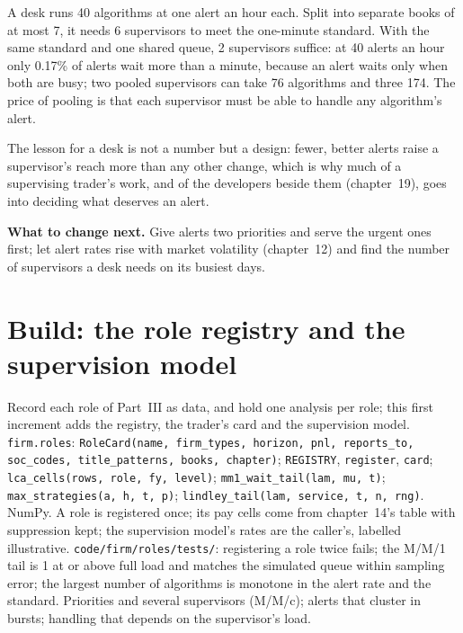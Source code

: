 \begin{example}[Pooling]\label{ex:in:trader:pool}
A desk runs 40 algorithms at one alert an hour each. Split into separate books of at most 7, it needs 6 supervisors to
meet the one-minute standard. With the same standard and one shared queue, 2 supervisors suffice: at 40 alerts an hour
only 0.17\% of alerts wait more than a minute, because an alert waits only when both are busy; two pooled supervisors
can take 76 algorithms and three 174. The price of pooling is that each supervisor must be able to handle any
algorithm's alert.
\end{example}

The lesson for a desk is not a number but a design: fewer, better alerts raise a supervisor's reach more than any other
change, which is why much of a supervising trader's work, and of the developers beside them (chapter~19), goes into
deciding what deserves an alert.

\textbf{What to change next.} Give alerts two priorities and serve the urgent ones first; let alert rates rise with market
volatility (chapter~12) and find the number of supervisors a desk needs on its busiest days.

\section{Build: the role registry and the supervision model}\label{bld:in:trader:roles}

\begin{build}
 Record each role of Part~III as data, and hold one analysis per role; this first increment adds the
registry, the trader's card and the supervision model.
 \texttt{firm.roles}: \texttt{RoleCard(name, firm\_types, horizon, pnl, reports\_to, soc\_codes,
title\_patterns, books, chapter)}; \texttt{REGISTRY}, \texttt{register}, \texttt{card}; \texttt{lca\_cells(rows, role, fy,
level)}; \texttt{mm1\_wait\_tail(lam, mu, t)}; \texttt{max\_strategies(a, h, t, p)}; \texttt{lindley\_tail(lam, service, t,
n, rng)}. NumPy.
 A role is registered once; its pay cells come from chapter~14's table with suppression kept; the
supervision model's rates are the caller's, labelled illustrative.
 \texttt{code/firm/roles/tests/}: registering a role twice fails; the M/M/1 tail is 1 at or
above full load and matches the simulated queue within sampling error; the largest number of algorithms is monotone in
the alert rate and the standard.
 Priorities and several supervisors (M/M/c); alerts that cluster in bursts; handling that depends on the
supervisor's load.
\end{build}


